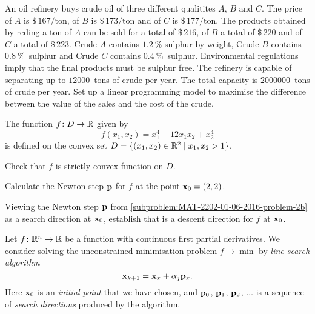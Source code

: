 \begin{subproblem}
    \newcommand{\dollar}[1]{\$\,\num{#1}}
    \newcommand{\oil}[1]{$\dollar{#1}/\text{ton}$}
    An oil refinery buys crude oil of three different qualitites $A$, $B$ and $C$. 
    The price of $A$ is \oil{167}, of $B$ is \oil{173} and of $C$ is \oil{177}. The products obtained by reding a ton of $A$ can be sold for a total of $\dollar{216}$, of $B$ a total of $\dollar{220}$ and of $C$ a total of $\dollar{223}$. Crude $A$ contains $\SI{1.2}{\percent}$ sulphur by weight, Crude $B$ contains $\SI{0.8}{\percent}$~sulphur and Crude $C$ contains $\SI{0.4}{\percent}$~sulphur. 
    Environmental regulations imply that the final products must be sulphur free. 
    The refinery is capable of separating up to $\num{12000}$~tons of crude per year. The total capacity
    is $\num{2000000}$~tons of crude per year. Set up
    a linear programming model to maximise the difference between the value of the sales and the cost of the crude. 
\end{subproblem}

\vspace*{-0.5cm}
\Problem

The function $\fun{D}{\R}$ given by
%
\begin{equation}
    f(x_1,x_2) = x_1^4 - 12x_1x_2 + x_2^4
\end{equation}
%
is defined on the convex set $D = \{ (x_1,x_2) \in \mathbb{R}^2 \mid x_1, x_2 > 1\}$. 

\begin{subproblem}
    Check that $f$ is strictly convex function on $D$. 
\end{subproblem}

\begin{subproblem}
    \label{subproblem:MAT-2202-01-06-2016-problem-2b}
    Calculate the Newton step $\mathbf{p}$ for $f$ at the point $\mathbf{x}_0 = (2,2)$.
\end{subproblem}

\begin{subproblem}
    Viewing the Newton step $\mathbf{p}$ from \cref{subproblem:MAT-2202-01-06-2016-problem-2b} as a search direction at $\mathbf{x}_0$, establish that is a descent direction for $f$ at $\mathbf{x}_0$.
\end{subproblem}

\vspace*{-0.5cm}
\Problem

Let $\fun{\R^n}{\R}$ be a function with continuous first partial derivatives. We consider solving the 
unconstrained minimisation problem $f \to \min$ by
\emph{line search algorithm} 
%
\begin{equation}
    \mathbf{x}_{k+1} = \mathbf{x}_x + \alpha_j \mathbf{p}_x.
\end{equation}
%
Here $\mathbf{x}_0$ is an \emph{initial point} that we have chosen, and $\mathbf{p}_0$, $\mathbf{p}_1$, $\mathbf{p}_2$, $\ldots$ is a sequence of \emph{search directions} produced by the algorithm.

